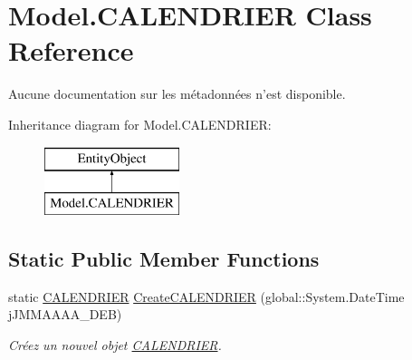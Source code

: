 \hypertarget{class_model_1_1_c_a_l_e_n_d_r_i_e_r}{\section{Model.\-C\-A\-L\-E\-N\-D\-R\-I\-E\-R Class Reference}
\label{class_model_1_1_c_a_l_e_n_d_r_i_e_r}
}


Aucune documentation sur les métadonnées n'est disponible.  


Inheritance diagram for Model.\-C\-A\-L\-E\-N\-D\-R\-I\-E\-R\-:\begin{figure}[H]
\begin{center}
\leavevmode
\includegraphics[height=2.000000cm]{class_model_1_1_c_a_l_e_n_d_r_i_e_r}
\end{center}
\end{figure}
\subsection*{Static Public Member Functions}
\begin{DoxyCompactItemize}
\item 
static \hyperlink{class_model_1_1_c_a_l_e_n_d_r_i_e_r}{C\-A\-L\-E\-N\-D\-R\-I\-E\-R} \hyperlink{class_model_1_1_c_a_l_e_n_d_r_i_e_r_a6f0ca13a05bde43050b45903be040a94}{Create\-C\-A\-L\-E\-N\-D\-R\-I\-E\-R} (global\-::\-System.\-Date\-Time j\-J\-M\-M\-A\-A\-A\-A\-\_\-\-D\-E\-B)
\begin{DoxyCompactList}\small\item\em Créez un nouvel objet \hyperlink{class_model_1_1_c_a_l_e_n_d_r_i_e_r}{C\-A\-L\-E\-N\-D\-R\-I\-E\-R}. \end{DoxyCompactList}\end{DoxyCompactItemize}
